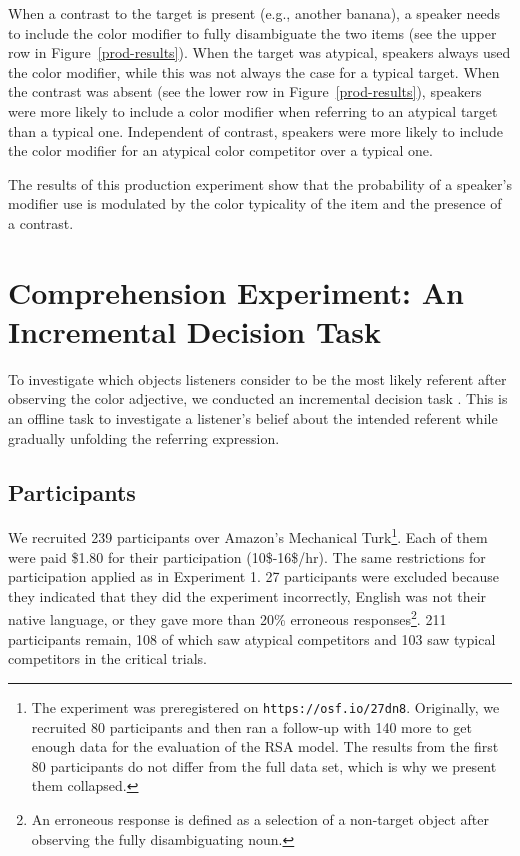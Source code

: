 \documentclass[10pt,letterpaper]{article}
\begin{document}
When a contrast to the target is present (e.g., another banana), a speaker needs to include the color modifier to fully disambiguate the two items (see the upper row in Figure~\ref{prod-results}). When the target was atypical, speakers always used the color modifier, while this was not always the case for a typical target. When the contrast was absent (see the lower row in Figure~\ref{prod-results}), speakers were more likely to include a color modifier when referring to an atypical target than a typical one. Independent of contrast, speakers were more likely to include the color modifier for an atypical color competitor over a typical one.

The results of this production experiment show that the probability of a speaker's modifier use is modulated by the color typicality of the item and the presence of a contrast. 


\section{Comprehension Experiment: An Incremental Decision Task}

To investigate which objects listeners consider to be the most likely referent after observing the color adjective, we conducted an incremental decision task \cite{Qing:2018}. This is an offline task to investigate a listener's belief about the intended referent while gradually unfolding the referring expression.


\subsection{Participants}
We recruited 239 participants over Amazon's Mechanical Turk\footnote{The experiment was preregistered on \texttt{https://osf.io/27dn8}. Originally, we recruited 80 participants and then ran a follow-up with 140 more to get enough data for the evaluation of the RSA model. The results from the first 80 participants do not differ from the full data set, which is why we present them collapsed.}. Each of them were paid \$1.80 for their participation (10\$-16\$/hr). The same restrictions for participation applied as in Experiment 1. 
27 participants were excluded because they indicated that they did the experiment incorrectly, English was not their native language, or they gave more than 20\% erroneous responses\footnote{An erroneous response is defined as a selection of a non-target object after observing the fully disambiguating noun.}. 211 participants remain, 108 of which saw atypical competitors and 103 saw typical competitors in the critical trials. 
\end{document}
